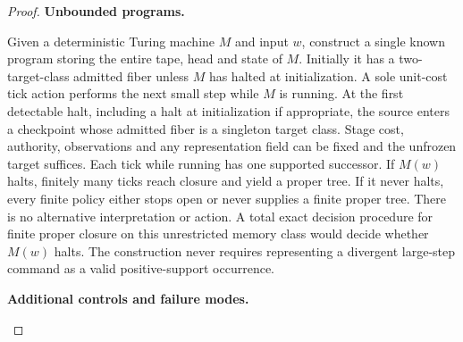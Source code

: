 \begin{proof}
\textbf{Unbounded programs.}

Given a deterministic Turing machine \(M\) and input \(w\), construct a single known program storing the entire tape, head and state of \(M\). Initially it has a two-target-class admitted fiber unless \(M\) has halted at initialization. A sole unit-cost tick action performs the next small step while \(M\) is running. At the first detectable halt, including a halt at initialization if appropriate, the source enters a checkpoint whose admitted fiber is a singleton target class. Stage cost, authority, observations and any representation field can be fixed and the unfrozen target suffices. Each tick while running has one supported successor. If \(M(w)\) halts, finitely many ticks reach closure and yield a proper tree. If it never halts, every finite policy either stops open or never supplies a finite proper tree. There is no alternative interpretation or action. A total exact decision procedure for finite proper closure on this unrestricted memory class would decide whether \(M(w)\) halts. The construction never requires representing a divergent large-step command as a valid positive-support occurrence.

\textbf{Additional controls and failure modes.}

\begin{itemize}


\end{itemize}
\end{proof}
